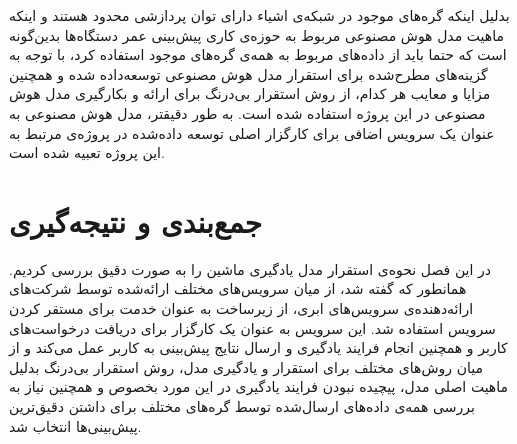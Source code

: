 بدلیل اینکه گره‌های موجود در شبکه‌ی اشیاء دارای توان پردازشی محدود هستند و اینکه ماهیت مدل هوش‌ مصنوعی مربوط به حوزه‌ی کاری پیش‌بینی عمر دستگاه‌ها بدین‌گونه است که حتما باید از داده‌های مربوط به همه‌ی گره‌های موجود استفاده کرد، با توجه به گزینه‌های مطرح‌شده برای استقرار مدل هوش مصنوعی توسعه‌داده شده و همچنین مزایا و معایب هر کدام، از روش استقرار بی‌درنگ برای ارائه و بکارگیری مدل هوش مصنوعی در این پروژه استفاده شده است. به طور دقیقتر، مدل هوش مصنوعی به عنوان یک سرویس اضافی برای کارگزار اصلی توسعه‌ داده‌شده در پروژه‌ی مرتبط 
به این پروژه تعبیه شده است. 

\section{جمع‌بندی و نتیجه‌گیری}
در این فصل نحوه‌ی استقرار مدل یادگیری ماشین را به صورت دقیق بررسی کردیم. همانطور که گفته شد، از میان سرویس‌های مختلف ارائه‌شده توسط شرکت‌های ارائه‌دهنده‌ی سرویس‌های ابری، از زیرساخت به عنوان خدمت برای مستقر کردن سرویس استفاده‌ شد. این سرویس به عنوان یک کارگزار برای دریافت درخواست‌های کاربر و همچنین انجام فرایند یادگیری و ارسال نتایج پیش‌بینی به کاربر عمل می‌کند و از میان روش‌های مختلف برای استقرار و یادگیری مدل، روش استقرار بی‌درنگ بدلیل ماهیت اصلی مدل، پیچیده نبودن فرایند یادگیری در این مورد بخصوص و همچنین نیاز به بررسی همه‌ی داده‌های ارسال‌شده توسط گره‌های مختلف برای داشتن دقیق‌ترین پیش‌بینی‌ها انتخاب شد.